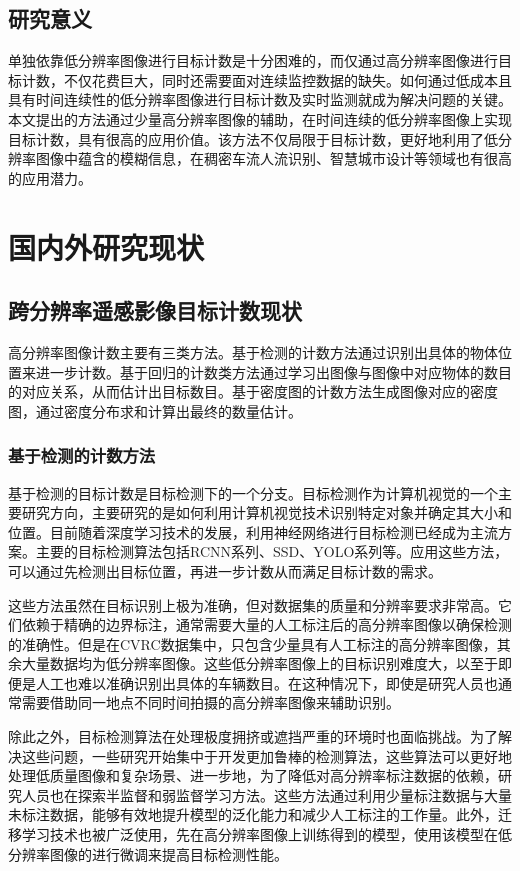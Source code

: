\subsection{研究意义}
单独依靠低分辨率图像进行目标计数是十分困难的，而仅通过高分辨率图像进行目标计数，不仅花费巨大，同时还需要面对连续监控数据的缺失。如何通过低成本且具有时间连续性的低分辨率图像进行目标计数及实时监测就成为解决问题的关键。本文提出的方法通过少量高分辨率图像的辅助，在时间连续的低分辨率图像上实现目标计数，具有很高的应用价值。该方法不仅局限于目标计数，更好地利用了低分辨率图像中蕴含的模糊信息，在稠密车流人流识别、智慧城市设计等领域也有很高的应用潜力。

\section{国内外研究现状}
\subsection{跨分辨率遥感影像目标计数现状}
高分辨率图像计数主要有三类方法。基于检测的计数方法通过识别出具体的物体位置来进一步计数。基于回归的计数类方法通过学习出图像与图像中对应物体的数目的对应关系，从而估计出目标数目。基于密度图的计数方法生成图像对应的密度图，通过密度分布求和计算出最终的数量估计。

\subsubsection{基于检测的计数方法}
基于检测的目标计数是目标检测下的一个分支。目标检测作为计算机视觉的一个主要研究方向，主要研究的是如何利用计算机视觉技术识别特定对象并确定其大小和位置。目前随着深度学习技术的发展，利用神经网络进行目标检测已经成为主流方案。主要的目标检测算法包括RCNN系列\cite{girshick2014rich,girshick2015fast,ren2015faster}、SSD\cite{liu2016ssd}、YOLO系列\cite{redmon2016you,redmon2017yolo9000,redmon2018yolov3}等。应用这些方法，可以通过先检测出目标位置，再进一步计数从而满足目标计数的需求。

这些方法虽然在目标识别上极为准确，但对数据集的质量和分辨率要求非常高。它们依赖于精确的边界标注，通常需要大量的人工标注后的高分辨率图像以确保检测的准确性。但是在CVRC数据集中，只包含少量具有人工标注的高分辨率图像，其余大量数据均为低分辨率图像。这些低分辨率图像上的目标识别难度大，以至于即便是人工也难以准确识别出具体的车辆数目。在这种情况下，即使是研究人员也通常需要借助同一地点不同时间拍摄的高分辨率图像来辅助识别。

除此之外，目标检测算法在处理极度拥挤或遮挡严重的环境时也面临挑战。为了解决这些问题，一些研究\cite{2023LowResolutionSelfAttentionSemanticSegmentation}开始集中于开发更加鲁棒的检测算法，这些算法可以更好地处理低质量图像和复杂场景、进一步地，为了降低对高分辨率标注数据的依赖，研究人员也在探索半监督和弱监督学习方法\cite{karimijafarbigloo2023self}。这些方法通过利用少量标注数据与大量未标注数据，能够有效地提升模型的泛化能力和减少人工标注的工作量。此外，迁移学习技术\cite{cheng2021transfer}也被广泛使用，先在高分辨率图像上训练得到的模型，使用该模型在低分辨率图像的进行微调来提高目标检测性能。


